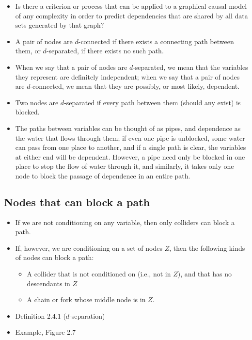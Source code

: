 \documentclass[]{article}
\providecommand{\tightlist}{%
  \setlength{\itemsep}{0pt}\setlength{\parskip}{0pt}}
\begin{document}
\begin{itemize}
\item
  Is there a criterion or process that can be applied to a graphical
  causal model of any complexity in order to predict dependencies that
  are shared by all data sets generated by that graph?
\item
  A pair of nodes are \(d\)-connected if there exists a connecting path
  between them, or \(d\)-separated, if there exists no such path.
\item
  When we say that a pair of nodes are \(d\)-separated, we mean that the
  variables they represent are definitely independent; when we say that
  a pair of nodes are \(d\)-connected, we mean that they are possibly,
  or most likely, dependent.
\item
  Two nodes are \(d\)-separated if every path between them (should any
  exist) is blocked.
\item
  The paths between variables can be thought of as pipes, and dependence
  as the water that flows through them; if even one pipe is unblocked,
  some water can pass from one place to another, and if a single path is
  clear, the variables at either end will be dependent. However, a pipe
  need only be blocked in one place to stop the flow of water through
  it, and similarly, it takes only one node to block the passage of
  dependence in an entire path.
\end{itemize}

\subsection{Nodes that can block a
path}\label{nodes-that-can-block-a-path}

\begin{itemize}
\item
  If we are not conditioning on any variable, then only colliders can
  block a path.
\item
  If, however, we are conditioning on a set of nodes \(Z\), then the
  following kinds of nodes can block a path:

  \begin{itemize}
  \tightlist
  \item
    A collider that is not conditioned on (i.e., not in \(Z\)), and that
    has no descendants in \(Z\)
  \item
    A chain or fork whose middle node is in \(Z\).
  \end{itemize}
\item
  Definition 2.4.1 (\(d\)-separation)
\item
  Example, Figure 2.7
\end{itemize}
\end{document}
